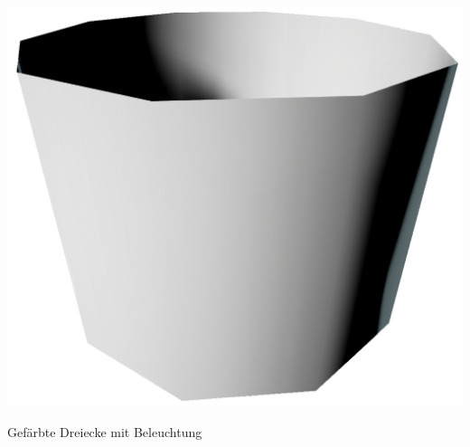 \newpage
\begin{center}
	\includegraphics[height=.9\textheight]{images/CH4_Zylinder10SegmenteOpaque.png}
	
	Gefärbte Dreiecke mit Beleuchtung
\end{center}





